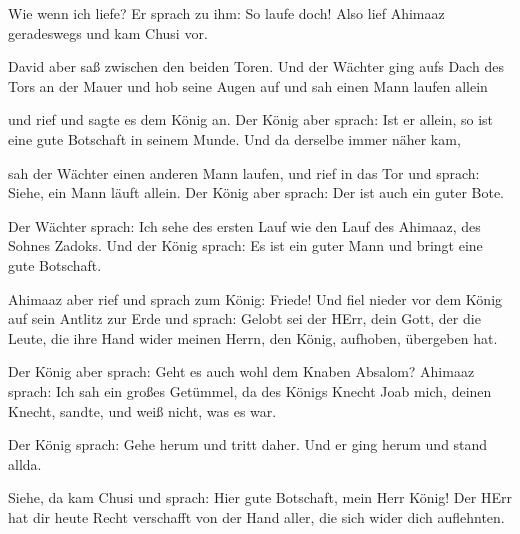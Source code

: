  Wie wenn ich liefe? Er sprach zu ihm: So laufe doch! Also
lief Ahimaaz geradeswegs und kam Chusi vor.

 David aber saß zwischen den beiden Toren. Und der Wächter
ging aufs Dach des Tors an der Mauer und hob seine Augen auf und sah
einen Mann laufen allein

 und rief und sagte es dem König an. Der König aber sprach:
Ist er allein, so ist eine gute Botschaft in seinem Munde. Und da
derselbe immer näher kam,

 sah der Wächter einen anderen Mann laufen, und rief in das
Tor und sprach: Siehe, ein Mann läuft allein. Der König aber sprach: Der
ist auch ein guter Bote.

 Der Wächter sprach: Ich sehe des ersten Lauf wie den Lauf
des Ahimaaz, des Sohnes Zadoks. Und der König sprach: Es ist ein guter
Mann und bringt eine gute Botschaft.

 Ahimaaz aber rief und sprach zum König: Friede! Und fiel
nieder vor dem König auf sein Antlitz zur Erde und sprach: Gelobt sei
der HErr, dein Gott, der die Leute, die ihre Hand wider meinen Herrn,
den König, aufhoben, übergeben hat.

 Der König aber sprach: Geht es auch wohl dem Knaben
Absalom? Ahimaaz sprach: Ich sah ein großes Getümmel, da des Königs
Knecht Joab mich, deinen Knecht, sandte, und weiß nicht, was es war.

 Der König sprach: Gehe herum und tritt daher. Und er ging
herum und stand allda.

 Siehe, da kam Chusi und sprach: Hier gute Botschaft, mein
Herr König! Der HErr hat dir heute Recht verschafft von der Hand aller,
die sich wider dich auflehnten.

